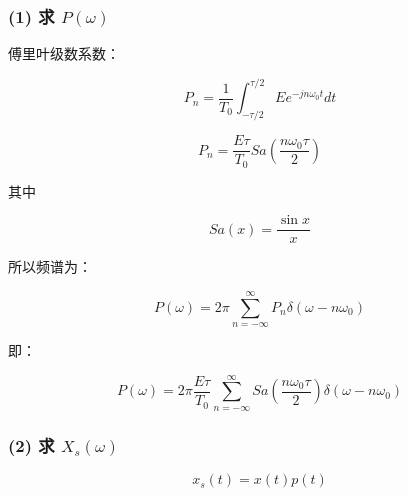 \documentclass[11pt]{ctexart}
\begin{document}
\subsubsection*{(1) 求 \(P(\omega)\)}



傅里叶级数系数：\par



\[

P_n=\frac{1}{T_0}\int_{-\tau/2}^{\tau/2}E e^{-jn\omega_0t}dt

\]



\[

P_n=\frac{E\tau}{T_0}

Sa\left(\frac{n\omega_0\tau}{2}\right)

\]



其中\par



\[

Sa(x)=\frac{\sin x}{x}

\]



所以频谱为：\par



\[

P(\omega)=2\pi\sum_{n=-\infty}^{\infty}

P_n\delta(\omega-n\omega_0)

\]



即：\par



\[

P(\omega)=

2\pi\frac{E\tau}{T_0}

\sum_{n=-\infty}^{\infty}

Sa\left(\frac{n\omega_0\tau}{2}\right)

\delta(\omega-n\omega_0)

\]



\subsubsection*{(2) 求 \(X_s(\omega)\)}



\[

x_s(t)=x(t)p(t)

\]
\end{document}
